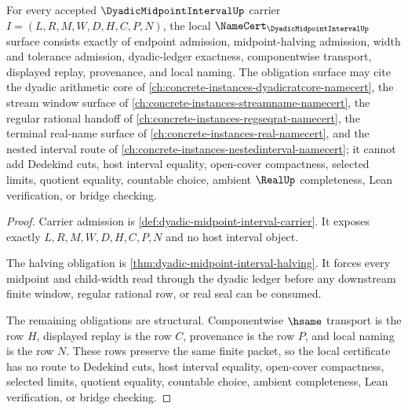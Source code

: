 \begin{theorem}
\label{thm:dyadic-midpoint-interval-namecert-obligations}
For every accepted $\DyadicMidpointIntervalUp$ carrier $I=(L,R,M,W,D,H,C,P,N)$, the local $\NameCert_{\DyadicMidpointIntervalUp}$ surface consists exactly of endpoint admission, midpoint-halving admission, width and tolerance admission, dyadic-ledger exactness, componentwise transport, displayed replay, provenance, and local naming. The obligation surface may cite the dyadic arithmetic core of \autoref{ch:concrete-instances-dyadicratcore-namecert}, the stream window surface of \autoref{ch:concrete-instances-streamname-namecert}, the regular rational handoff of \autoref{ch:concrete-instances-regseqrat-namecert}, the terminal real-name surface of \autoref{ch:concrete-instances-real-namecert}, and the nested interval route of \autoref{ch:concrete-instances-nestedinterval-namecert}; it cannot add Dedekind cuts, host interval equality, open-cover compactness, selected limits, quotient equality, countable choice, ambient $\RealUp$ completeness, Lean verification, or bridge checking.
\end{theorem}
\begin{proof}
Carrier admission is \autoref{def:dyadic-midpoint-interval-carrier}. It exposes exactly $L,R,M,W,D,H,C,P,N$ and no host interval object.

The halving obligation is \autoref{thm:dyadic-midpoint-interval-halving}. It forces every midpoint and child-width read through the dyadic ledger before any downstream finite window, regular rational row, or real seal can be consumed.

The remaining obligations are structural. Componentwise $\hsame$ transport is the row $H$, displayed replay is the row $C$, provenance is the row $P$, and local naming is the row $N$. These rows preserve the same finite packet, so the local certificate has no route to Dedekind cuts, host interval equality, open-cover compactness, selected limits, quotient equality, countable choice, ambient completeness, Lean verification, or bridge checking.
\end{proof}


